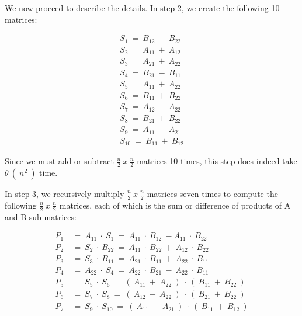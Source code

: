 We now proceed to describe the details. In step 2, we create the following 10 matrices: \hfill \break

\begin{ceqn}
\begin{align*}
S_{1}\ =\ B_{12}\ -\ B_{22} \\
S_{2}\ =\ A_{11}\ +\ A_{12} \\
S_{3}\ =\ A_{21}\ +\ A_{22} \\
S_{4}\ =\ B_{21}\ -\ B_{11} \\
S_{5}\ =\ A_{11}\ +\ A_{22} \\
S_{6}\ =\ B_{11}\ +\ B_{22} \\
S_{7}\ =\ A_{12}\ -\ A_{22} \\
S_{8}\ =\ B_{21}\ +\ B_{22} \\
S_{9}\ =\ A_{11}\ -\ A_{21} \\
S_{10}\ =\ B_{11}\ +\ B_{12}
\end{align*}
\end{ceqn} \hfill

Since we must add or subtract $\frac{n}{2}\ x\ \frac{n}{2}$ matrices 10 times, this step does indeed take $\theta\ (\ n^{2}\ )$ time. \hfill \break

In step 3, we recursively multiply $\frac{n}{2}\ x\ \frac{n}{2}$ matrices seven times to compute the following $\frac{n}{2}\ x\ \frac{n}{2}$ matrices, each of which is the sum or difference of products of A and B sub-matrices: \hfill \break

\begin{ceqn}
\begin{align*}
P_{1}\ &=\ A_{11}\ \cdot\ S_{1}\ =\ A_{11}\ \cdot\ B_{12}\ - A_{11}\ \cdot\ B_{22} \\
P_{2}\ &=\ S_{2}\ \cdot\ B_{22}\ =\ A_{11}\ \cdot\ B_{22}\ +\ A_{12}\ \cdot\ B_{22} \\
P_{3}\ &=\ S_{3}\ \cdot\ B_{11}\ =\ A_{21}\ \cdot\ B_{11}\ +\ A_{22}\ \cdot\ B_{11} \\
P_{4}\ &=\ A_{22}\ \cdot\ S_{4}\ =\ A_{22}\ \cdot\ B_{21}\ -\ A_{22}\ \cdot\ B_{11} \\
P_{5}\ &=\ S_{5}\ \cdot\ S_{6}\ =\ (\ A_{11}\ +\ A_{22}\ )\ \cdot\ (\ B_{11}\ +\ B_{22}\ ) \\
P_{6}\ &=\ S_{7}\ \cdot\ S_{8}\ =\ (\ A_{12}\ -\ A_{22}\ )\ \cdot\ (\ B_{21}\ +\ B_{22}\ ) \\
P_{7}\ &=\ S_{9}\ \cdot\ S_{10}\ =\ (\ A_{11}\ -\ A_{21}\ )\ \cdot\ (\ B_{11}\ +\ B_{12}\ )
\end{align*}
\end{ceqn} \hfill

